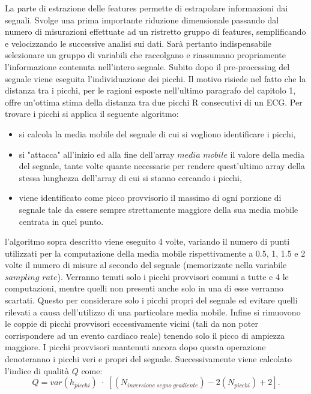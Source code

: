 \documentclass[a4paper, 12pt]{book}
\begin{document}
La parte di estrazione delle features permette di estrapolare informazioni dai segnali.
Svolge una prima importante riduzione dimensionale passando dal numero di misurazioni effettuate ad un ristretto gruppo di features, semplificando e velocizzando le successive analisi sui dati.
Sarà pertanto indispensabile selezionare un gruppo di variabili che raccolgano e riassumano propriamente l'informazione contenuta nell'intero segnale.
Subito dopo il pre-processing del segnale viene eseguita l'individuazione dei picchi.
Il motivo risiede nel fatto che la distanza tra i picchi, per le ragioni esposte nell'ultimo paragrafo del capitolo 1, offre un'ottima stima della distanza tra due picchi R consecutivi di un ECG.
Per trovare i picchi si applica il seguente algoritmo:\begin{itemize}
	\item si calcola la media mobile del segnale di cui si vogliono identificare i 					  picchi,
	\item si "attacca" all'inizio ed alla fine dell'array $media$ $mobile$ il valore 				  della media del segnale, tante volte quante necessarie per rendere 						  quest'ultimo array della stessa lunghezza dell'array di cui si stanno 					  cercando i picchi,
	\item viene identificato come picco provvisorio il massimo di ogni porzione di 					  segnale tale da essere sempre strettamente maggiore della sua media mobile 				  centrata in quel punto.
\end{itemize}
l'algoritmo sopra descritto viene eseguito 4 volte, variando il numero di punti utilizzati per la computazione della media mobile rispettivamente a 0.5, 1, 1.5 e 2 volte il numero di misure al secondo del segnale (memorizzate nella variabile $sampling$ $rate$).
Verranno tenuti solo i picchi provvisori comuni a tutte e 4 le computazioni, mentre quelli non presenti anche solo in una di esse verranno scartati.
Questo per considerare solo i picchi propri del segnale ed evitare quelli rilevati a causa dell'utilizzo di una particolare media mobile.
Infine si rimuovono le coppie di picchi provvisori eccessivamente vicini (tali da non poter corrispondere ad un evento cardiaco reale) tenendo solo il picco di ampiezza maggiore.
I picchi provvisori mantenuti ancora dopo questa operazione denoteranno i picchi veri e propri del segnale.
Successivamente viene calcolato l'indice di qualità $Q$ come:
\begin{equation}
	Q = var(h_{picchi})\;\cdot\;[(N_{inversione\;segno\;gradiente}) - 2(N_{picchi}) +2].
\end{equation}
\end{document}
